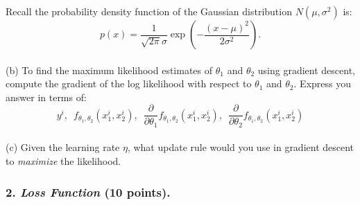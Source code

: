\documentclass[12pt]{article}%
\begin{document}
Recall the probability density function of the Gaussian distribution $N(\mu,\sigma^2)$ is:
\begin{equation}
    p(x)=\frac{1}{\sqrt{2\pi}\sigma}\exp\left(-\frac{(x-\mu)^2}{2\sigma^2} \right).
    \tag{4}
\end{equation}
\vspace{1em}
\\
(b) To find the maximum likelihood estimates of $\theta_1$ and $\theta_2$ using gradient descent, compute the gradient of the log likelihood with respect to $\theta_1$ and $\theta_2$. Express you answer in terms of:
\begin{equation*}
    y^i, \enspace f_{\theta_1,\theta_2}(x^i_1, x^i_2), \enspace \frac{\partial}{\partial\theta_1}f_{\theta_1,\theta_2}(x^i_1, x^i_2), \enspace \frac{\partial}{\partial\theta_2}f_{\theta_1,\theta_2}(x^i_1, x^i_2)
\end{equation*}
\vspace{1em}
\\
(c) Given the learning rate $\eta$, what update rule would you use in gradient descent to \textit{maximize} the likelihood.

\pagebreak



\pagebreak

\subsubsection*{2. \textit{Loss Function} (10 points).}
\end{document}
